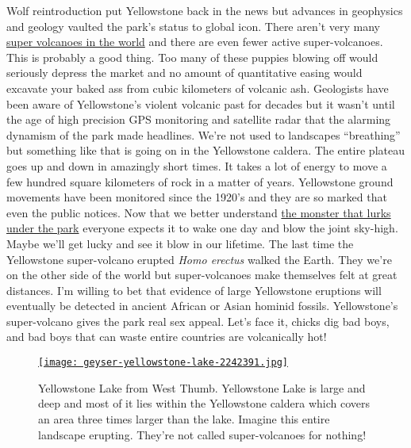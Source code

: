 Wolf reintroduction put Yellowstone back in the news but advances in
geophysics and geology vaulted the park's status to global icon. There
aren't very many
\href{http://wiki.answers.com/Q/How\_many\_super\_volcanoes\_are\_there\_all\_together\_in\_the\_world}{super
volcanoes in the world} and there are even fewer active super-volcanoes.
This is probably a good thing. Too many of these puppies blowing off
would seriously depress the market and no amount of quantitative easing
would excavate your baked ass from cubic kilometers of volcanic ash.
Geologists have been aware of Yellowstone's violent volcanic past for
decades but it wasn't until the age of high precision GPS monitoring and
satellite radar that the alarming dynamism of the park made headlines.
We're not used to landscapes ``breathing'' but something like that is
going on in the Yellowstone caldera. The entire plateau goes up and down
in amazingly short times. It takes a lot of energy to move a few hundred
square kilometers of rock in a matter of years. Yellowstone ground
movements have been monitored since the 1920's and they are so marked
that even the public notices. Now that we better understand
\href{http://ngm.nationalgeographic.com/2009/08/yellowstone/yellowstone-interactive}{the
monster that lurks under the park} everyone expects it to wake one day
and blow the joint sky-high. Maybe we'll get lucky and see it blow in
our lifetime. The last time the Yellowstone super-volcano erupted
\emph{Homo erectus} walked the Earth. They we're on the other side of
the world but super-volcanoes make themselves felt at great distances.
I'm willing to bet that evidence of large Yellowstone eruptions will
eventually be detected in ancient African or Asian hominid fossils.
Yellowstone's super-volcano gives the park real sex appeal. Let's face
it, chicks dig bad boys, and bad boys that can waste entire countries
are volcanically hot!



\begin{SCfigure}
\centering
\centering
\href{http://conceptcontrol.smugmug.com/Trips/USA-and-Canada/North-Western/i-6R2qMdw/A}{\texttt{[image: geyser-yellowstone-lake-2242391.jpg]}}
\caption[Yellowstone Lake from West Thumb.]{Yellowstone Lake from West Thumb. Yellowstone Lake is large and deep and
most of it lies within the Yellowstone caldera which covers an area
three times larger than the lake. Imagine this entire landscape
erupting. They're not called super-volcanoes for nothing!}
\label{fig:4186X4}
\end{SCfigure}


